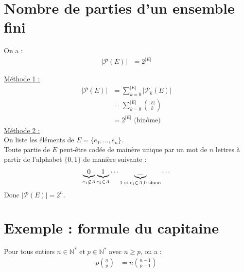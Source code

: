 \documentclass[../main.tex]{subfiles}
\begin{document}
\section{Nombre de parties d'un ensemble fini}
\begin{tcolorbox}[title=Théorème 31.49, title filled=false, colframe=orange, colback=orange!10!white]
    On a : 
    \begin{align*}
        |\mathcal{P}(E)| &= 2^{|E|}
    \end{align*}
\end{tcolorbox}

\noindent\underline{Méthode 1 :} \\
\begin{align*}
    |\mathcal{P}(E)| &= \sum_{k=0}^{|E|} |\mathcal{P}_k(E)| \\
    &= \sum_{k=0}^{|E|} \binom{|E|}{k} \\
    &= 2^{|E|} \text{ (binôme)} 
\end{align*}
\noindent\underline{Méthode 2 :} \\
On liste les éléments de $E = \{ e_1, \ldots, e_n \}$. \\
Toute partie de $E$ peut-être codée de mainère unique par un mot de $n$ lettres à partir de l'alphabet $\{0, 1\}$ de manière suivante : 
\begin{align*}
    \underbrace{0}_{e_1\not\in A} \space \underbrace{1}_{e_2\in A} \space \cdots \space \underbrace{\_}_{1 \text{ si } e_i\in A, 0 \text{ sinon}} \space \cdots 
\end{align*}
Donc $|\mathcal{P}(E)| = 2^n$.

\section{Exemple : formule du capitaine}
\begin{tcolorbox}[title=Exemple 31.51, title filled=false, colframe=darkgreen, colback=darkgreen!10!white]
    Pour tous entiers $n\in \mathbb{N}^*$ et $p\in \mathbb{N}^*$ avec $n\geq p$, on a :
    \begin{align*}
        p\binom{n}{p} &= n\binom{n-1}{p-1}
    \end{align*}
\end{tcolorbox}
\end{document}
